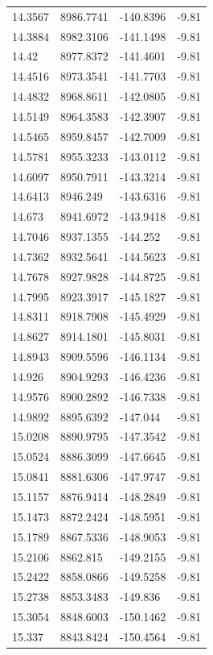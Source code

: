 \begin{table}[H]
\begin{tabular}{llll}
14.3567 & 8986.7741 & -140.8396 & -9.81 \\
14.3884 & 8982.3106 & -141.1498 & -9.81 \\
14.42 & 8977.8372 & -141.4601 & -9.81 \\
14.4516 & 8973.3541 & -141.7703 & -9.81 \\
14.4832 & 8968.8611 & -142.0805 & -9.81 \\
14.5149 & 8964.3583 & -142.3907 & -9.81 \\
14.5465 & 8959.8457 & -142.7009 & -9.81 \\
14.5781 & 8955.3233 & -143.0112 & -9.81 \\
14.6097 & 8950.7911 & -143.3214 & -9.81 \\
14.6413 & 8946.249 & -143.6316 & -9.81 \\
14.673 & 8941.6972 & -143.9418 & -9.81 \\
14.7046 & 8937.1355 & -144.252 & -9.81 \\
14.7362 & 8932.5641 & -144.5623 & -9.81 \\
14.7678 & 8927.9828 & -144.8725 & -9.81 \\
14.7995 & 8923.3917 & -145.1827 & -9.81 \\
14.8311 & 8918.7908 & -145.4929 & -9.81 \\
14.8627 & 8914.1801 & -145.8031 & -9.81 \\
14.8943 & 8909.5596 & -146.1134 & -9.81 \\
14.926 & 8904.9293 & -146.4236 & -9.81 \\
14.9576 & 8900.2892 & -146.7338 & -9.81 \\
14.9892 & 8895.6392 & -147.044 & -9.81 \\
15.0208 & 8890.9795 & -147.3542 & -9.81 \\
15.0524 & 8886.3099 & -147.6645 & -9.81 \\
15.0841 & 8881.6306 & -147.9747 & -9.81 \\
15.1157 & 8876.9414 & -148.2849 & -9.81 \\
15.1473 & 8872.2424 & -148.5951 & -9.81 \\
15.1789 & 8867.5336 & -148.9053 & -9.81 \\
15.2106 & 8862.815 & -149.2155 & -9.81 \\
15.2422 & 8858.0866 & -149.5258 & -9.81 \\
15.2738 & 8853.3483 & -149.836 & -9.81 \\
15.3054 & 8848.6003 & -150.1462 & -9.81 \\
15.337 & 8843.8424 & -150.4564 & -9.81 \\

\end{tabular}
\end{table}
